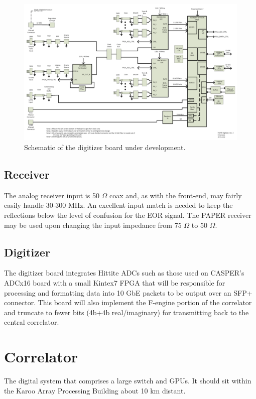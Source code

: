 \documentclass[11pt]{article}
\begin{document}
\begin{figure}[H]
\centering
\includegraphics[width=\textwidth]{plots/herald.png}
\caption{Schematic of the digitizer board under development.}
\label{fig:herald}
\end{figure}

\subsection{Receiver}
The analog receiver input is 50 $\Omega$ coax and, as with the front-end, may fairly easily handle 30-300 MHz.  An excellent input match is needed to keep the reflections below the level of confusion for the EOR signal.  The PAPER receiver may be used upon changing the input impedance from 75 $\Omega$ to 50 $\Omega$.

\subsection{Digitizer}
The digitizer board integrates Hittite ADCs
such as those used on CASPER's ADCx16 board with a small Kintex7 FPGA
that will be responsible for processing and formatting data into 10 GbE packets to be output
over an SFP+ connector.  This board will also implement the F-engine portion of the correlator and truncate to fewer bits (4b+4b real/imaginary) for transmitting back to the central correlator.

\section{Correlator}
The digital system that comprises a large switch and GPUs.  It should sit within the Karoo Array Processing
Building about 10 km distant.
\end{document}
